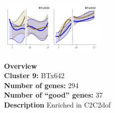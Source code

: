 \begin{multicols}{2}
\includegraphics[width=2in]{figures/clusters/root_Preflowering_8.png}
\columnbreak

\noindent \textbf{Overview}\\\textbf{Cluster 9:} BTx642 \\
\textbf{Number of genes:} 294 \\
\textbf{Number of ``good'' genes:} 37 \\
\textbf{Description} Enriched in C2C2dof \\
\end{multicols}

